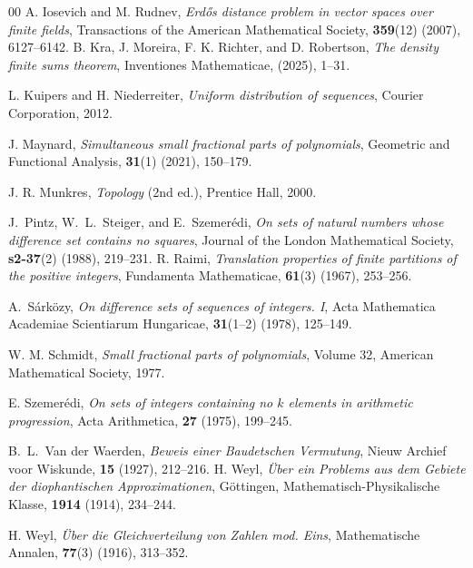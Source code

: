 \documentclass[11pt]{article}
\theoremstyle{definition}
\begin{document}
\begin{thebibliography}{00}
A. Iosevich and M. Rudnev, \textit{Erd\H{o}s distance problem in vector spaces over finite fields},  Transactions of the American Mathematical Society, \textbf{359}(12) (2007), 6127--6142.
B. Kra, J. Moreira, F. K. Richter, and D. Robertson, \textit{The density finite sums theorem}, Inventiones Mathematicae, (2025), 1--31.

L. Kuipers and H. Niederreiter, \textit{Uniform distribution of sequences}, Courier Corporation, 2012.

J. Maynard, \textit{Simultaneous small fractional parts of polynomials}, Geometric and Functional Analysis, \textbf{31}(1) (2021), 150--179.

J. R. Munkres, \textit{Topology} (2nd ed.), Prentice Hall, 2000.

J.~Pintz, W.~L.~Steiger, and E.~Szemer\'edi,
\emph{On sets of natural numbers whose difference set contains no squares},
Journal of the London Mathematical Society, \textbf{s2-37}(2) (1988), 219--231.
  R. Raimi, \textit{Translation properties of finite partitions of the positive integers}, Fundamenta Mathematicae, \textbf{61}(3) (1967), 253--256.



A.~S\'ark\"ozy,
\emph{On difference sets of sequences of integers. I},
Acta Mathematica Academiae Scientiarum Hungaricae, \textbf{31}(1--2) (1978), 125--149.

W. M. Schmidt, \textit{Small fractional parts of polynomials}, Volume 32, American Mathematical Society, 1977.

 E. Szemer\'{e}di, \textit{On sets of integers containing no $k$ elements in arithmetic progression}, Acta Arithmetica, \textbf{27} (1975), 199--245.


B.~L.~Van der Waerden,
\emph{Beweis einer Baudetschen Vermutung},
Nieuw Archief voor Wiskunde, \textbf{15} (1927), 212--216.
 H. Weyl, \textit{Über ein Problems aus dem Gebiete der diophantischen Approximationen}, Göttingen, Mathematisch-Physikalische Klasse, \textbf{1914} (1914), 234--244.

H. Weyl, \textit{Über die Gleichverteilung von Zahlen mod. Eins}, Mathematische Annalen, \textbf{77}(3) (1916), 313--352.



\end{thebibliography}
\end{document}
